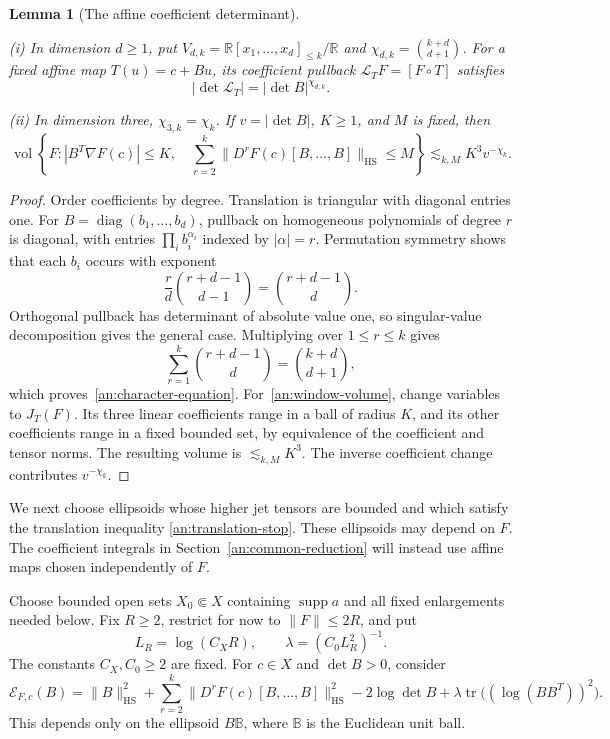 \documentclass[11pt]{amsart}
\newtheorem{lemma}[theorem]{Lemma}
\theoremstyle{definition}
\theoremstyle{remark}
\numberwithin{equation}{section}
\begin{document}
\begin{lemma}[The affine coefficient determinant]\label{an:character}

\leavevmode\noindent\textup{(i)} In dimension $d\ge1$, put $V_{d,k}=\mathbb R[x_1,\ldots,x_d]_{\le k}/\mathbb R$ and $\chi_{d,k}=\binom{k+d}{d+1}$. For a fixed affine map $T(u)=c+Bu$, its coefficient pullback $\mathcal L_TF=[F\circ T]$ satisfies
\begin{equation}\label{an:character-equation}
|\det\mathcal L_T|=|\det B|^{\chi_{d,k}}.
\end{equation}

\noindent\textup{(ii)} In dimension three, $\chi_{3,k}=\chi_k$. If $v=|\det B|$, $K\ge1$, and $M$ is fixed, then
\begin{equation}\label{an:window-volume}
\operatorname{vol}\left\{F:|B^T\nabla F(c)|\le K,\quad \sum_{r=2}^k\|D^rF(c)[B,\ldots,B]\|_{\mathrm{HS}}\le M\right\}\lesssim_{k,M} K^3v^{-\chi_k}.
\end{equation}
\end{lemma}
\begin{proof}
Order coefficients by degree. Translation is triangular with diagonal entries one. For $B=\operatorname{diag}(b_1,\ldots,b_d)$, pullback on homogeneous polynomials of degree $r$ is diagonal, with entries $\prod_i b_i^{\alpha_i}$ indexed by $|\alpha|=r$. Permutation symmetry shows that each $b_i$ occurs with exponent
\[
\frac r d\binom{r+d-1}{d-1}=\binom{r+d-1}{d}.
\]
Orthogonal pullback has determinant of absolute value one, so singular-value decomposition gives the general case. Multiplying over $1\le r\le k$ gives
\[
\sum_{r=1}^k\binom{r+d-1}{d}=\binom{k+d}{d+1},
\]
which proves~\eqref{an:character-equation}. For~\eqref{an:window-volume}, change variables to $J_T(F)$. Its three linear coefficients range in a ball of radius $K$, and its other coefficients range in a fixed bounded set, by equivalence of the coefficient and tensor norms. The resulting volume is $\lesssim_{k,M}K^3$. The inverse coefficient change contributes $v^{-\chi_k}$.
\end{proof}

We next choose ellipsoids whose higher jet tensors are bounded and which satisfy the translation inequality \eqref{an:translation-stop}. These ellipsoids may depend on $F$. The coefficient integrals in Section~\ref{an:common-reduction} will instead use affine maps chosen independently of $F$.

Choose bounded open sets $X_0\Subset X$ containing $\operatorname{supp}a$ and all fixed enlargements needed below. Fix $R\ge2$, restrict for now to $\|F\|\le2R$, and put
\[
L_R=\log(C_XR),\qquad \lambda=(C_0L_R^2)^{-1}.
\]
The constants $C_X,C_0\ge2$ are fixed. For $c\in X$ and $\det B>0$, consider
\begin{equation}\label{an:energy}
\mathscr E_{F,c}(B)=\|B\|_{\mathrm{HS}}^2+\sum_{r=2}^k\|D^rF(c)[B,\ldots,B]\|_{\mathrm{HS}}^2-2\log\det B+\lambda\operatorname{tr}\bigl((\log(BB^T))^2\bigr).
\end{equation}
This depends only on the ellipsoid $B\mathbb B$, where $\mathbb B$ is the Euclidean unit ball.
\end{document}
